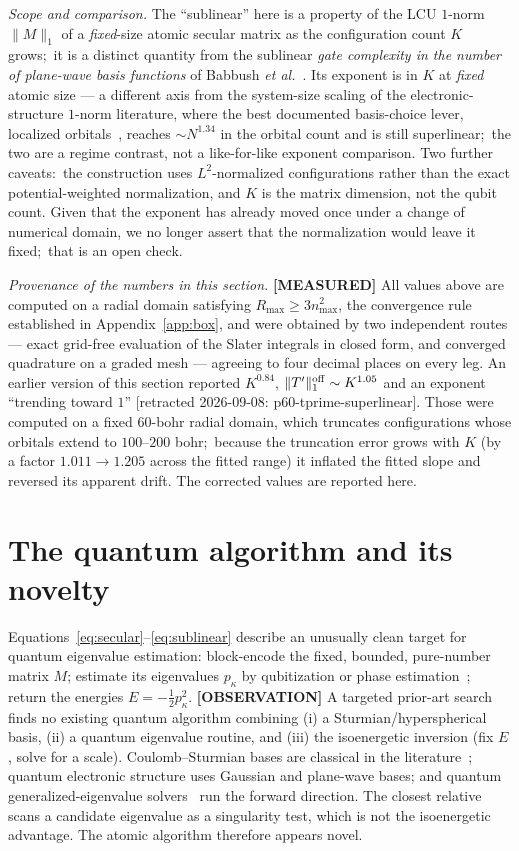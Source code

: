 \documentclass[aps,pra,twocolumn,superscriptaddress,longbibliography]{revtex4-2}
\begin{document}
\emph{Scope and comparison.}  The ``sublinear'' here is a property of the LCU
$1$-norm $\|M\|_1$ of a \emph{fixed}-size atomic secular matrix as the
configuration count $K$ grows;\ it is a distinct quantity from the sublinear
\emph{gate complexity in the number of plane-wave basis functions} of Babbush
\emph{et al.}~\cite{babbush2019}.  Its exponent is in $K$ at \emph{fixed} atomic
size --- a different axis from the system-size scaling of the
electronic-structure $1$-norm literature, where the best documented
basis-choice lever, localized orbitals~\cite{koridon2021}, reaches
$\sim\!N^{1.34}$ in the orbital count and is still superlinear;\ the two are a
regime contrast, not a like-for-like exponent comparison.  Two further caveats:\
the construction uses $L^{2}$-normalized configurations rather than the exact
potential-weighted normalization, and $K$ is the matrix dimension, not the qubit
count.  Given that the exponent has already moved once under a change of
numerical domain, we no longer assert that the normalization would leave it
fixed;\ that is an open check.

\emph{Provenance of the numbers in this section.}  \textbf{[MEASURED]}  All
values above are computed on a radial domain satisfying $R_{\max}\ge 3n_{\max}^{2}$,
the convergence rule established in Appendix~\ref{app:box}, and were obtained
by two independent routes --- exact grid-free evaluation of the Slater integrals
in closed form, and converged quadrature on a graded mesh --- agreeing to four
decimal places on every leg.  An earlier version of this section reported
$K^{0.84}$, $\|T'\|^{\rm off}_1\sim K^{1.05}$ and an exponent ``trending toward
$1$'' [retracted 2026-09-08: p60-tprime-superlinear].  Those were computed on a fixed $60$-bohr radial domain, which truncates
configurations whose orbitals extend to $100$--$200$ bohr;\ because the
truncation error grows with $K$ (by a factor $1.011\to1.205$ across the fitted
range) it inflated the fitted slope and reversed its apparent drift.  The
corrected values are reported here.

\section{The quantum algorithm and its novelty}
\label{sec:quantum}

Equations~\eqref{eq:secular}--\eqref{eq:sublinear} describe an unusually clean
target for quantum eigenvalue estimation: block-encode the fixed, bounded,
pure-number matrix $M$; estimate its eigenvalues $p_\kappa$ by qubitization or
phase estimation~\cite{lowchuang2019}; return the energies $E=-\tfrac12
p_\kappa^2$.  \textbf{[OBSERVATION]} A targeted prior-art search finds no existing
quantum algorithm combining (i) a Sturmian/hyperspherical basis, (ii) a quantum
eigenvalue routine, and (iii) the isoenergetic inversion (fix $E$, solve for a
scale).  Coulomb--Sturmian bases are classical in the
literature~\cite{herbst2019}; quantum electronic structure uses Gaussian and
plane-wave bases; and quantum generalized-eigenvalue
solvers~\cite{liang2022,rajchel2025} run the forward direction.  The closest
relative~\cite{rajchel2025} scans a candidate eigenvalue as a singularity test,
which is not the isoenergetic advantage.  The atomic algorithm therefore appears
novel.
\end{document}
